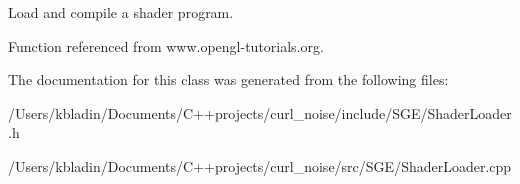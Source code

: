 Load and compile a shader program. 

Function referenced from www.\-opengl-\/tutorials.\-org. 

The documentation for this class was generated from the following files\-:\begin{DoxyCompactItemize}
\item 
/\-Users/kbladin/\-Documents/\-C++projects/curl\-\_\-noise/include/\-S\-G\-E/Shader\-Loader.\-h\item 
/\-Users/kbladin/\-Documents/\-C++projects/curl\-\_\-noise/src/\-S\-G\-E/Shader\-Loader.\-cpp\end{DoxyCompactItemize}
